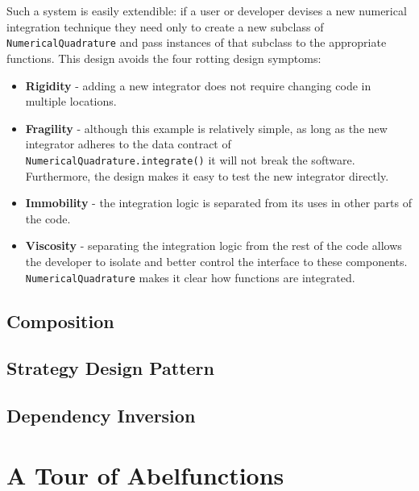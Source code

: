 Such a system is easily extendible: if a user or developer devises a new
numerical integration technique they need only to create a new subclass of {\tt
  NumericalQuadrature} and pass instances of that subclass to the appropriate
functions. This design avoids the four rotting design symptoms:
\begin{itemize}
\item {\bf Rigidity} - adding a new integrator does not require changing code in
  multiple locations.
\item {\bf Fragility} - although this example is relatively simple, as long as
  the new integrator adheres to the data contract of {\tt
    NumericalQuadrature.integrate()} it will not break the software.
  Furthermore, the design makes it easy to test the new integrator directly.
\item {\bf Immobility} - the integration logic is separated from its uses in
  other parts of the code. 
\item {\bf Viscosity} - separating the integration logic from the rest of the
  code allows the developer to isolate and better control the interface to these
  components. {\tt NumericalQuadrature} makes it clear how functions are
  integrated.
\end{itemize}



      

\subsection{Composition}

\subsection{Strategy Design Pattern}

\subsection{Dependency Inversion}


\section{A Tour of Abelfunctions}\label{sec:abelfunctions-a-tour-of-abelfunctions}

